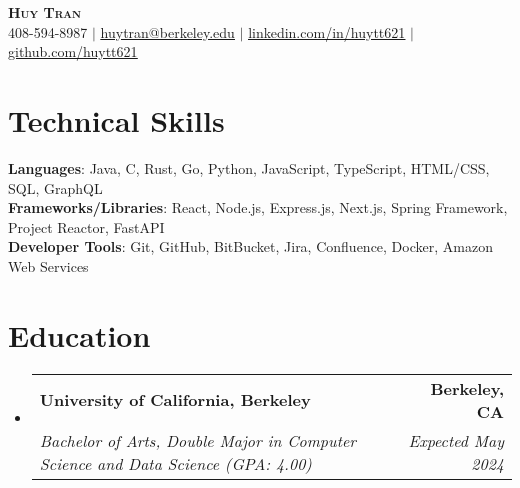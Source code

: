 \documentclass[letterpaper,11pt]{article}
\makeatletter
\newcommand{\resumeSubheading}[4]{
  \vspace{-2pt}\item
    \begin{tabular*}{0.97\textwidth}[t]{l@{\extracolsep{\fill}}r}
      \textbf{#1} & #2 \\
      \textit{\small#3} & \textit{\small #4} \\
    \end{tabular*}\vspace{-7pt}
}
\newcommand{\resumeSubHeadingListStart}{\begin{itemize}[leftmargin=0.15in, label={}]}
\newcommand{\resumeSubHeadingListEnd}{\end{itemize}}
\makeatother
\begin{document}

\begin{center}
    \textbf{\Huge \scshape Huy Tran} \\ \vspace{1pt}
    \small 408-594-8987 $|$ \href{mailto:huytran@berkeley.edu}{\underline{huytran@berkeley.edu}} $|$ 
    \href{https://linkedin.com/in/huytt621}{\underline{linkedin.com/in/huytt621}} $|$
    \href{https://github.com/huytt621}{\underline{github.com/huytt621}}
\end{center}


%
\section{\textbf{Technical Skills}}
 \begin{itemize}[leftmargin=0.15in, label={}]
    \small{\item{
     \textbf{Languages}{: Java, C, Rust, Go, Python, JavaScript, TypeScript, HTML/CSS, SQL, GraphQL} \\
     \textbf{Frameworks/Libraries}{: React, Node.js, Express.js, Next.js, Spring Framework, Project Reactor, FastAPI} \\
     \textbf{Developer Tools}{: Git, GitHub, BitBucket, Jira, Confluence, Docker, Amazon Web Services} \\
    }}
 \end{itemize}


\section{\textbf{Education}}
  \resumeSubHeadingListStart
    \resumeSubheading
      {University of California, Berkeley}{\textbf{Berkeley, CA}}
      {Bachelor of Arts, Double Major in Computer Science and Data Science (GPA: 4.00)}{Expected May 2024}

  \resumeSubHeadingListEnd
\end{document}
